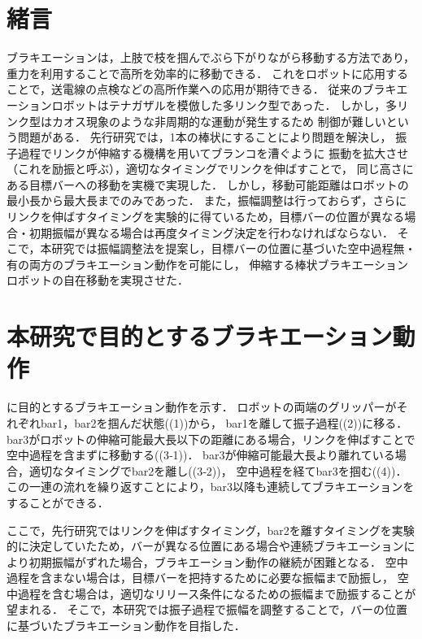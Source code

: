 \begin{small}
\section{緒言}
\vspace{-3mm}
ブラキエーションは，上肢で枝を掴んでぶら下がりながら移動する方法であり，
重力を利用することで高所を効率的に移動できる．
これをロボットに応用することで\cite{福田敏男1990ブラキエーション形移動ロボットの研究}，送電線の点検などの高所作業への応用が期待できる．
従来のブラキエーションロボットはテナガザルを模倣した多リンク型であった．
しかし，多リンク型はカオス現象のような非周期的な運動が発生するため
制御が難しいという問題がある\cite{鈴木三男2000二重振り子におけるカオス的振舞}．
先行研究では，1本の棒状にすることにより問題を解決し，
振子過程でリンクが伸縮する機構を用いてブランコを漕ぐように
振動を拡大させ（これを励振と呼ぶ），適切なタイミングでリンクを伸ばすことで，
同じ高さにある目標バーへの移動を実機で実現した\cite{Hijiri:Robomech2024}．
しかし，移動可能距離はロボットの最小長から最大長までのみであった．
また，振幅調整は行っておらず，さらにリンクを伸ばすタイミングを実験的に得ているため，目標バーの位置が異なる場合・初期振幅が異なる場合は再度タイミング決定を行わなければならない．
そこで，本研究では振幅調整法を提案し，目標バーの位置に基づいた空中過程無・有の両方のブラキエーション動作を可能にし，
伸縮する棒状ブラキエーションロボットの自在移動を実現させた．
\section{本研究で目的とするブラキエーション動作}
\vspace{-2mm}
に目的とするブラキエーション動作を示す．
ロボットの両端のグリッパーがそれぞれbar1，bar2を掴んだ状態((1))から，
bar1を離して振子過程((2))に移る．
bar3がロボットの伸縮可能最大長以下の距離にある場合，リンクを伸ばすことで空中過程を含まずに移動する((3‐1))．
bar3が伸縮可能最大長より離れている場合，適切なタイミングでbar2を離し((3‐2))，
空中過程を経てbar3を掴む((4))．この一連の流れを繰り返すことにより，bar3以降も連続してブラキエーションをすることができる．

ここで，先行研究ではリンクを伸ばすタイミング，bar2を離すタイミングを実験的に決定していたため，バーが異なる位置にある場合や連続ブラキエーションにより初期振幅がずれた場合，ブラキエーション動作の継続が困難となる．
空中過程を含まない場合は，目標バーを把持するために必要な振幅まで励振し，
空中過程を含む場合は，適切なリリース条件になるための振幅まで励振することが望まれる．
そこで，本研究では振子過程で振幅を調整することで，バーの位置に基づいたブラキエーション動作を目指した．


\end{small}
